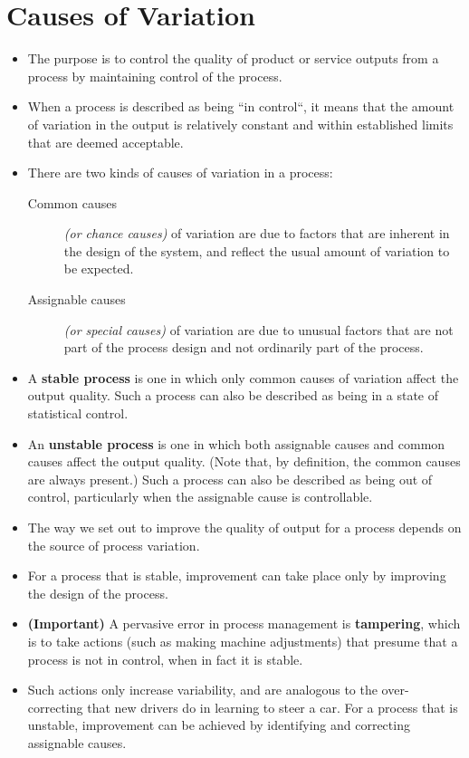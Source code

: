 \documentclass[]{report}
\begin{document}
{\section{Causes of Variation}
\begin{itemize}
	\item The purpose is to control the quality of product or service outputs from a process by
	maintaining control of the process.
	\item When a process is described as being ``in control``, it means that the amount of
	variation in the output is relatively constant and within established limits that are
	deemed acceptable.
	\item There are two kinds of causes of variation in a process:
	\begin{description}
	\item[Common causes] \textit{(or chance causes)} of variation are due to factors that are
	inherent in the design of the system, and reflect the usual amount of variation
	to be expected.
	\item[Assignable causes] \textit{(or special causes)} of variation are due to unusual
	factors that are not part of the process design and not ordinarily part of the
	process.
\end{description}
	\item A \textbf{stable process} is one in which only common causes of variation affect the output
	quality. Such a process can also be described as being in a state of statistical
	control.
	\item An \textbf{unstable process} is one in which both assignable causes and common causes
	affect the output quality. (Note that, by definition, the common causes are always
	present.)
	Such a process can also be described as being out of control, particularly when the
	assignable cause is controllable.
	\item The way we set out to improve the quality of output for a process depends on the
	source of process variation.
	\item For a process that is stable, improvement can take place only by improving the
	design of the process. 
	\item \textbf{(Important)} A pervasive error in process management is \textbf{tampering},
	which is to take actions (such as making machine adjustments) that presume that a
	process is not in control, when in fact it is stable.
	\item Such actions only increase variability, and are analogous to the over-correcting that
	new drivers do in learning to steer a car. For a process that is unstable, improvement
	can be achieved by identifying and correcting assignable causes.	
\end{itemize}


}
\end{document}
